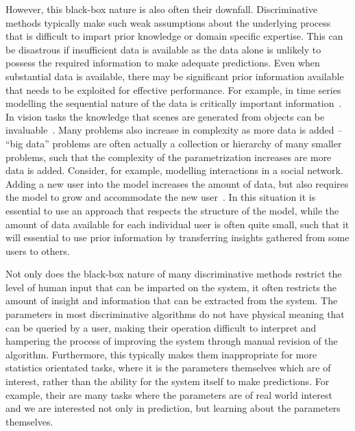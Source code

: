 However, this black-box nature is also often their downfall.  Discriminative methods typically make
such weak assumptions about the underlying process that is difficult to impart prior knowledge
or domain specific expertise.  This can be disastrous if insufficient data is available as the data
alone is unlikely to possess the required information to make adequate predictions.  Even when
substantial data is available, there may be significant prior information available that needs to be
exploited for effective performance.  For example, in time series modelling the sequential nature
of the data is critically important information~\citep{liu1998sequential}.  In vision tasks the 
knowledge that scenes are generated from objects can be invaluable~\citep{kulkarni2015picture}.
Many problems also increase in complexity as more data is added -- ``big data'' problems are often
actually a collection or hierarchy of many smaller problems, such that the complexity of the
parametrization increases are more data is added.  Consider, for example, modelling interactions in
a social network.  Adding a new user into the model increases the amount of data, but also
requires the model to grow and accommodate the new user~\citep{ravasz2003hierarchical}.  In
this situation it is essential to
use an approach that respects the structure of the model, while the amount of data available
for each individual user is often quite small, such that it will essential to use prior information
by transferring insights gathered from some users to others.

Not only does the black-box nature of many discriminative methods restrict the level of
human input that can be imparted on the system, it often restricts the amount of insight
and information that can be extracted from the system.  The parameters in most discriminative
algorithms do not have physical meaning that can be queried by a user, making their operation
difficult to interpret and hampering the process of improving the system through manual
revision of the algorithm.  Furthermore, this typically makes them inappropriate for more
statistics orientated tasks, where it is the parameters themselves which are of interest, rather
than the ability for the system itself to make predictions.  For example, their are many tasks
where the parameters are of real world interest and we are interested not only in prediction,
but learning about the parameters themselves.


